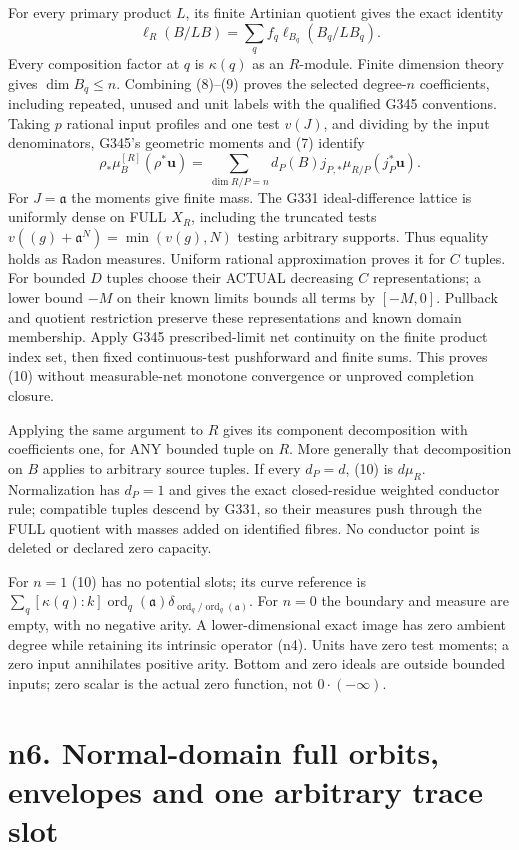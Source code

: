 \documentclass[11pt]{article}
\begin{document}
For every primary product $L$, its finite Artinian quotient gives the exact identity
\[
 \ell_R(B/LB)=\sum_q f_q\ell_{B_q}(B_q/LB_q). \tag{9}
\]
Every composition factor at $q$ is $\kappa(q)$ as an $R$-module. Finite dimension theory gives $\dim B_q\le n$. Combining (8)--(9) proves the selected degree-$n$ coefficients, including repeated, unused and unit labels with the qualified G345 conventions. Taking $p$ rational input profiles and one test $v(J)$, and dividing by the input denominators, G345's geometric moments and (7) identify
\[
 \rho_*\mu_B^{[R]}(\rho^*\boldsymbol u)
 =\sum_{\dim R/P=n}d_P(B)j_{P,*}\mu_{R/P}(j_P^*\boldsymbol u). \tag{10}
\]
For $J=\mathfrak a$ the moments give finite mass. The G331 ideal-difference lattice is uniformly dense on FULL $X_R$, including the truncated tests $v((g)+\mathfrak a^N)=\min(v(g),N)$ testing arbitrary supports. Thus equality holds as Radon measures. Uniform rational approximation proves it for $C$ tuples. For bounded $D$ tuples choose their ACTUAL decreasing $C$ representations; a lower bound $-M$ on their known limits bounds all terms by $[-M,0]$. Pullback and quotient restriction preserve these representations and known domain membership. Apply G345 prescribed-limit net continuity on the finite product index set, then fixed continuous-test pushforward and finite sums. This proves (10) without measurable-net monotone convergence or unproved completion closure.

Applying the same argument to $R$ gives its component decomposition with coefficients one, for ANY bounded tuple on $R$. More generally that decomposition on $B$ applies to arbitrary source tuples. If every $d_P=d$, (10) is $d\mu_R$. Normalization has $d_P=1$ and gives the exact closed-residue weighted conductor rule; compatible tuples descend by G331, so their measures push through the FULL quotient with masses added on identified fibres. No conductor point is deleted or declared zero capacity.

For $n=1$ (10) has no potential slots; its curve reference is $\sum_q[\kappa(q):k]\operatorname{ord}_q(\mathfrak a)\delta_{\operatorname{ord}_q/\operatorname{ord}_q(\mathfrak a)}$. For $n=0$ the boundary and measure are empty, with no negative arity. A lower-dimensional exact image has zero ambient degree while retaining its intrinsic operator (n4). Units have zero test moments; a zero input annihilates positive arity. Bottom and zero ideals are outside bounded inputs; zero scalar is the actual zero function, not $0\cdot(-\infty)$.


\section{n6. Normal-domain full orbits, envelopes and one arbitrary trace slot}
\end{document}
